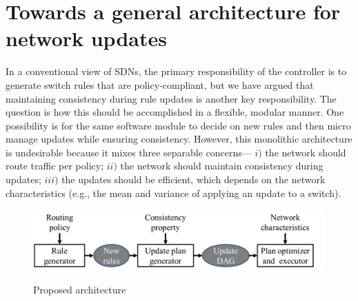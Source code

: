 \section{Towards a general architecture for network updates}
\label{sec:discussion}

In a conventional view of SDNs, the primary responsibility of the controller is to generate switch rules that are policy-compliant, but we have argued that maintaining consistency during rule updates is another key responsibility. The question is how this should be accomplished in a flexible, modular manner. One possibility is for the same software module to decide on new rules and then micro manage updates while ensuring consistency. However, this monolithic architecture is undesirable because it mixes three separable concerns--- $i)$ the network should route traffic per policy; $ii)$ the network should maintain consistency during updates; $iii)$ the updates should be efficient, which depends on the network characteristics (e.g., the mean and variance of applying an update to a switch).

\begin{figure}[t!]
  \centering
  \includegraphics[width=\columnwidth]{figures/arch.png}\\
  \caption{Proposed architecture}\label{fig:arch}
\end{figure}



